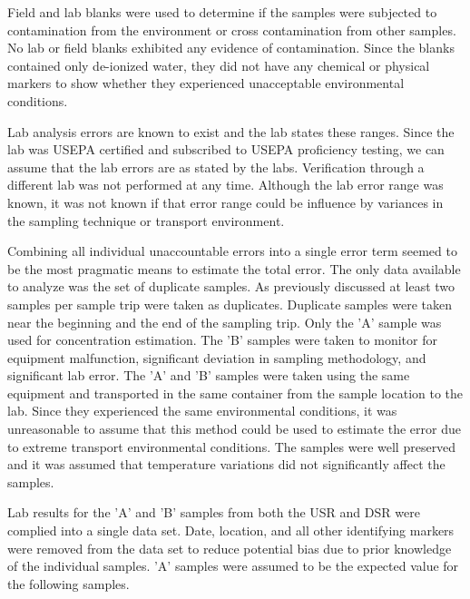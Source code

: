 \begin{linenumbers}
Field and lab blanks were used to determine if the samples were subjected to contamination from the environment or cross contamination from other samples.  No lab or field blanks exhibited any evidence of contamination.  Since the blanks contained only de-ionized water, they did not have any chemical or physical markers to show whether they experienced unacceptable environmental conditions.

Lab analysis errors are known to exist and the lab states these ranges.  Since the lab was USEPA certified and subscribed to USEPA proficiency testing, we can assume that the lab errors are as stated by the labs.  Verification through a different lab was not performed at any time.  Although the lab error range was known,  it was not known if that error range could be influence by variances in the sampling technique or transport environment.  

Combining all individual unaccountable errors into a single error term seemed to be the most pragmatic means to estimate the total error.  The only data available to analyze was the set of duplicate samples.  As previously discussed at least two samples per sample trip were taken as duplicates.  Duplicate samples were taken near the beginning and the end of the sampling trip.  Only the 'A' sample was used for concentration estimation.  The 'B' samples were taken to monitor for equipment malfunction, significant deviation in sampling methodology, and significant lab error.  The 'A' and 'B' samples were taken using the same equipment and transported in the same container from the sample location to the lab.  Since they experienced the same environmental conditions, it was unreasonable to assume that this method could be used to estimate the error due to extreme transport environmental conditions.  The samples were well preserved and it was assumed that temperature variations did not significantly affect the samples.  

Lab results for the 'A' and 'B' samples from both the USR and DSR were complied into a single data set.  Date, location, and all other identifying markers were removed from the data set to reduce potential bias due to prior knowledge of the individual samples.  'A' samples were assumed to be the expected value for the following samples.  


\end{linenumbers}
